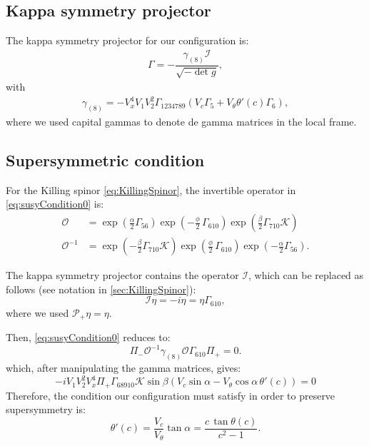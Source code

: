 

\subsection{Kappa symmetry projector}

The kappa symmetry projector for our configuration is:
\begin{align}
\Gamma = - \dfrac{ \gamma_{(8)} \mathcal{I} }{\sqrt{-\det g}},
\end{align}
with
\begin{align}
 \gamma_{(8)} = - V_x^4 V_1 V_2^2 \Gamma_{1 2 3 4 7 8 9}( V_c \Gamma_5 +  V_{\theta} \theta'(c) \Gamma_6), 
\end{align}
where we used capital gammas to denote de gamma matrices in the local frame. 


\subsection{Supersymmetric condition}

For the Killing spinor \eqref{eq:KillingSpinor}, the invertible operator in \eqref{eq:susyCondition0} is:
\begin{align}
 \mathcal{O} &= \exp{\left(\frac{\alpha}{2}\Gamma_{56} \right)} \exp{\left(-\frac{\phi}{2}\, \Gamma_{610} \right)} \exp{\left(\frac{\beta}{2}\Gamma_{710} \mathcal{K} \right)} \\
 \mathcal{O}^{-1} &=  \exp{\left(-\frac{\beta}{2}\Gamma_{710} \mathcal{K} \right)} 
 \exp{\left(\frac{\phi}{2}\, \Gamma_{610} \right)} 
 \exp{\left(-\frac{\alpha}{2}\Gamma_{56} \right)}.
\end{align}


The kappa symmetry projector contains the operator $\mathcal{I}$, which can be replaced as follows (see notation in \ref{sec:KillingSpinor}):
\begin{equation}
 \mathcal{I}\eta =-i \eta =\eta  \Gamma_{610},
\end{equation}
where we used $\mathcal{P}_+ \eta =\eta$. 

Then, \eqref{eq:susyCondition0} reduces to:
\begin{equation}
 \Pi_{-} \mathcal{O}^{-1} \gamma_{(8)} \mathcal{O} \Gamma_{610} \Pi_{+}  = 0.
\end{equation}
which, after manipulating the gamma matrices, gives:
\begin{equation}
-i V_1 V_2^2 V_x^4 \Pi_+ \Gamma_{6 8 9 10} \mathcal{K} \sin\beta \left(V_c \sin\alpha - V_\theta \cos\alpha \, \theta'(c)\right) = 0
\end{equation}
Therefore, the condition our configuration must satisfy in order to preserve supersymmetry is:
\begin{equation}\label{eq:susyConditionTheta}
 \theta'(c) = \dfrac{V_c}{V_\theta} \tan\alpha = \dfrac{c \, \tan\theta(c)}{c^2-1} .
\end{equation}


